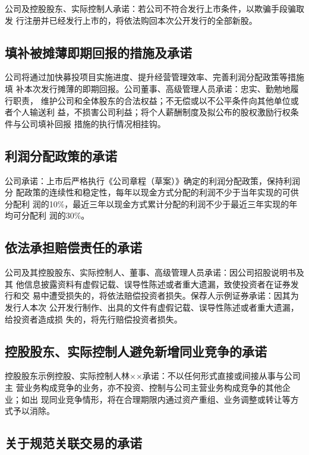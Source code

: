公司及控股股东、实际控制人承诺：若公司不符合发行上市条件，以欺骗手段骗取发
行注册并已经发行上市的，将依法购回本次公开发行的全部新股。

\subsection{填补被摊薄即期回报的措施及承诺}

公司将通过加快募投项目实施进度、提升经营管理效率、完善利润分配政策等措施填
补本次发行摊薄的即期回报。公司董事、高级管理人员承诺：忠实、勤勉地履行职责，
维护公司和全体股东的合法权益；不无偿或以不公平条件向其他单位或者个人输送利
益，不损害公司利益；将个人薪酬制度及拟公布的股权激励行权条件与公司填补回报
措施的执行情况相挂钩。

\subsection{利润分配政策的承诺}

公司承诺：上市后严格执行《公司章程（草案）》确定的利润分配政策，保持利润分
配政策的连续性和稳定性，每年以现金方式分配的利润不少于当年实现的可供分配利
润的10\%，最近三年以现金方式累计分配的利润不少于最近三年实现的年均可分配利
润的30\%。

\subsection{依法承担赔偿责任的承诺}

公司及其控股股东、实际控制人、董事、高级管理人员承诺：因公司招股说明书及其
他信息披露资料有虚假记载、误导性陈述或者重大遗漏，致使投资者在证券发行和交
易中遭受损失的，将依法赔偿投资者损失。保荐人示例证券承诺：因其为发行人本次
公开发行制作、出具的文件有虚假记载、误导性陈述或者重大遗漏，给投资者造成损
失的，将先行赔偿投资者损失。

\subsection{控股股东、实际控制人避免新增同业竞争的承诺}

控股股东示例控股、实际控制人林××承诺：不以任何形式直接或间接从事与公司主
营业务构成竞争的业务，亦不投资、控制与公司主营业务构成竞争的其他企业；如出
现同业竞争情形，将在合理期限内通过资产重组、业务调整或转让等方式予以消除。

\subsection{关于规范关联交易的承诺}

